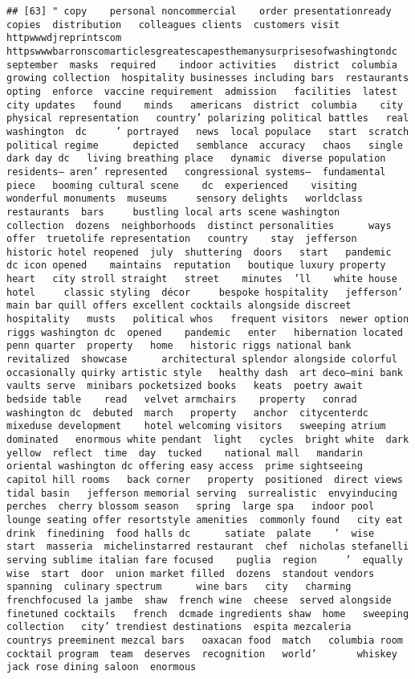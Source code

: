 \documentclass[
]{article}
\begin{document}
\begin{verbatim}
## [63] " copy    personal noncommercial    order presentationready copies  distribution   colleagues clients  customers visit httpwwwdjreprintscom httpswwwbarronscomarticlesgreatescapesthemanysurprisesofwashingtondc   september  masks  required    indoor activities   district  columbia  growing collection  hospitality businesses including bars  restaurants  opting  enforce  vaccine requirement  admission   facilities  latest city updates   found    minds   americans  district  columbia    city   physical representation   country’ polarizing political battles   real  washington  dc     ’ portrayed   news  local populace   start  scratch    political regime      depicted   semblance  accuracy   chaos   single dark day dc   living breathing place   dynamic  diverse population  residents— aren’ represented   congressional systems—  fundamental piece   booming cultural scene    dc  experienced    visiting   wonderful monuments  museums     sensory delights   worldclass restaurants  bars     bustling local arts scene washington   collection  dozens  neighborhoods  distinct personalities      ways offer  truetolife representation   country    stay  jefferson  historic hotel reopened  july  shuttering  doors   start   pandemic  dc icon opened    maintains  reputation   boutique luxury property   heart   city stroll straight   street    minutes  ’ll    white house  hotel     classic styling  décor     bespoke hospitality   jefferson’  main bar quill offers excellent cocktails alongside discreet hospitality   musts   political whos   frequent visitors  newer option  riggs washington dc  opened    pandemic   enter   hibernation located  penn quarter  property   home   historic riggs national bank     revitalized  showcase      architectural splendor alongside colorful  occasionally quirky artistic style   healthy dash  art deco—mini bank vaults serve  minibars pocketsized books   keats  poetry await   bedside table    read   velvet armchairs    property   conrad washington dc  debuted  march   property   anchor  citycenterdc  mixeduse development    hotel welcoming visitors   sweeping atrium dominated   enormous white pendant  light   cycles  bright white  dark yellow  reflect  time  day  tucked    national mall   mandarin oriental washington dc offering easy access  prime sightseeing  capitol hill rooms   back corner   property  positioned  direct views   tidal basin   jefferson memorial serving  surrealistic  envyinducing perches  cherry blossom season   spring  large spa   indoor pool  lounge seating offer resortstyle amenities  commonly found   city eat  drink  finedining  food halls dc      satiate  palate    ’  wise  start  masseria  michelinstarred restaurant  chef  nicholas stefanelli  serving sublime italian fare focused    puglia  region     ’  equally wise  start  door  union market filled  dozens  standout vendors spanning  culinary spectrum      wine bars   city   charming frenchfocused la jambe  shaw  french wine  cheese  served alongside finetuned cocktails   french  dcmade ingredients shaw  home   sweeping collection   city’ trendiest destinations  espita mezcaleria    countrys preeminent mezcal bars   oaxacan food  match   columbia room  cocktail program  team  deserves  recognition   world’       whiskey     jack rose dining saloon  enormous 
\end{verbatim}
\end{document}
